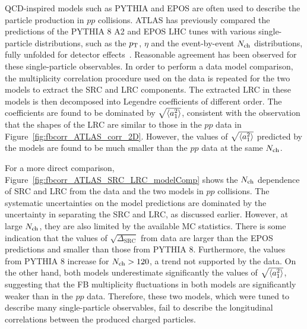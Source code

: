 QCD-inspired models such as PYTHIA and EPOS are often used to describe the particle production in $pp$ collisions. ATLAS has previously compared the predictions of the PYTHIA 8 A2 and EPOS LHC tunes with various single-particle distributions, such as the $p_\text{T}$, $\eta$ and the event-by-event $N_\text{ch}$ distributions, fully unfolded for detector effects~\cite{Aad:2016mok, Aaboud:2016itf}. Reasonable agreement has been observed for these single-particle observables. In order to perform a data model comparison, the multiplicity correlation procedure used on the data is repeated for the two models to extract the SRC and LRC components. The extracted LRC in these models is then decomposed into Legendre coefficients of different order. The coefficients are found to be dominated by $\sqrt{\left\langle a_1^2\right\rangle}$, consistent with the observation that the shapes of the LRC are similar to those in the $pp$ data in Figure~\ref{fig:fbcorr_ATLAS_corr_2D}. However, the values of $\sqrt{\left\langle a_1^2\right\rangle}$ predicted by the models are found to be much smaller than the $pp$ data at the same $N_\text{ch}$.

For a more direct comparison, Figure~\ref{fig:fbcorr_ATLAS_SRC_LRC_modelComp} shows the $N_\text{ch}$ dependence of SRC and LRC from the data and the two models in $pp$ collisions. The systematic uncertainties on the model predictions are dominated by the uncertainty in separating the SRC and LRC, as discussed earlier. However, at large $N_\text{ch}$, they are also limited by the available MC statistics. There is some indication that the values of $\sqrt{\Delta_\text{SRC}}$ from data are larger than the EPOS predictions and smaller than those from PYTHIA 8. Furthermore, the values from PYTHIA 8 increase for $N_\text{ch}>120$, a trend not supported by the data. On the other hand, both models underestimate significantly the values of $\sqrt{\left\langle a_1^2\right\rangle}$, suggesting that the FB multiplicity fluctuations in both models are significantly weaker than in the $pp$ data. Therefore, these two models, which were tuned to describe many single-particle observables, fail to describe the longitudinal correlations between the produced charged particles.

